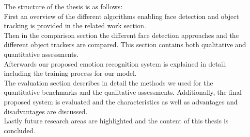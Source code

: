 The structure of the thesis is as follows:\\
First an overview of the different algorithms enabling face detection and object tracking is provided in the related work section.\\
Then in the comparison section the different face detection approaches and the different object trackers are compared. This section contains both qualitative and quantitative assessments.\\
Afterwards our proposed emotion recognition system is explained in detail, including the training process for our model.\\
The evaluation section describes in detail the methods we used for the quantitative benchmarks and the qualitative assessments. Additionally, the final proposed system is evaluated and the characteristics as well as advantages and disadvantages are discussed.\\
Lastly future research areas are highlighted and the content of this thesis is concluded.
